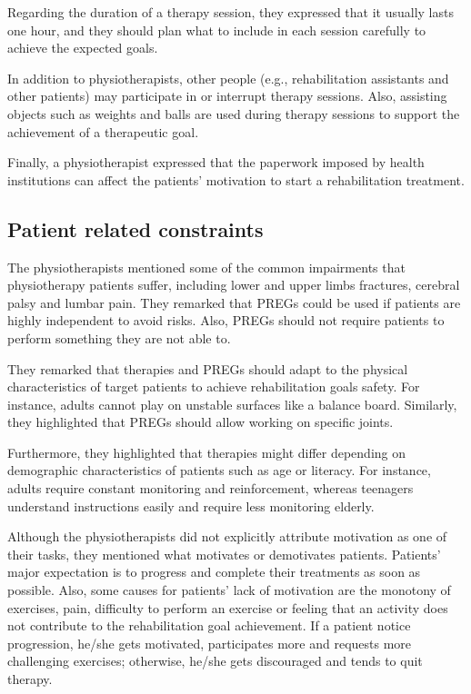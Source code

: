 Regarding the duration of a therapy session, they expressed that it usually lasts one hour, and they should plan what to include in each session carefully to achieve the expected goals.

In addition to physiotherapists, other people (e.g., rehabilitation assistants and other patients) may participate in or interrupt therapy sessions. Also, assisting objects such as weights and balls are used during therapy sessions to support the achievement of a therapeutic goal.

Finally, a physiotherapist expressed that the paperwork imposed by health institutions can affect the patients' motivation to start a rehabilitation treatment.

\subsection{Patient related constraints}
\label{sec:reh_patients_constraints}
The physiotherapists mentioned some of the common impairments that physiotherapy patients suffer, including lower and upper limbs fractures, cerebral palsy and lumbar pain. They remarked that \acp{PREG} could be used if patients are highly independent to avoid risks. Also, \acp{PREG} should not require patients to perform something they are not able to.

They remarked that therapies and \acp{PREG} should adapt to the physical characteristics of target patients to achieve rehabilitation goals safety. For instance, adults cannot play on unstable surfaces like a balance board. Similarly, they highlighted that \acp{PREG} should allow working on specific joints.

Furthermore, they highlighted that therapies might differ depending on demographic characteristics of patients such as age or literacy. For instance, adults require constant monitoring and reinforcement, whereas teenagers understand instructions easily and require less monitoring elderly.

Although the physiotherapists did not explicitly attribute motivation as one of their tasks, they mentioned what motivates or demotivates patients. Patients' major expectation is to progress and complete their treatments as soon as possible. Also, some causes for patients' lack of motivation are the monotony of exercises, pain, difficulty to perform an exercise or feeling that an activity does not contribute to the rehabilitation goal achievement. If a patient notice progression, he/she gets motivated, participates more and requests more challenging exercises; otherwise, he/she gets discouraged and tends to quit therapy.

